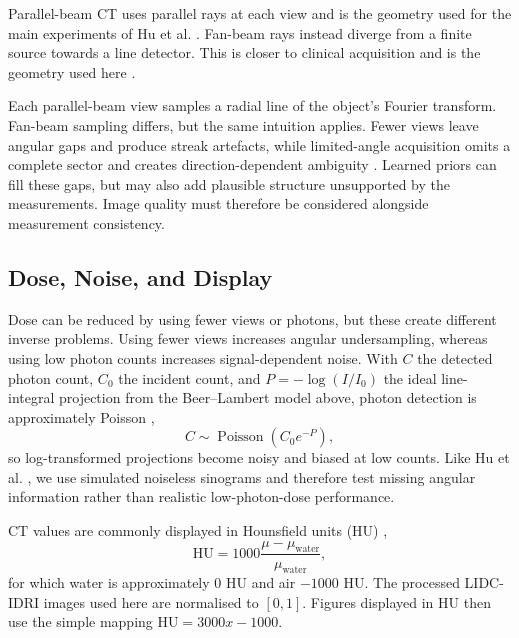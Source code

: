 Parallel-beam CT uses parallel rays at each view and is the geometry used for the main experiments of Hu et al. \cite{hu_learning_2024}. Fan-beam rays instead diverge from a finite source towards a line detector. This is closer to clinical acquisition and is the geometry used here \cite{wunderlich_image_2008}.

Each parallel-beam view samples a radial line of the object's Fourier transform. Fan-beam sampling differs, but the same intuition applies. Fewer views leave angular gaps and produce streak artefacts, while limited-angle acquisition omits a complete sector and creates direction-dependent ambiguity \cite{sidky_accurate_2006,frikel_characterization_2013}. Learned priors can fill these gaps, but may also add plausible structure unsupported by the measurements. Image quality must therefore be considered alongside measurement consistency.

\subsection{Dose, Noise, and Display}
\label{subsec:ct_noise_display}

Dose can be reduced by using fewer views or photons, but these create different inverse problems. Using fewer views increases angular undersampling, whereas using low photon counts increases signal-dependent noise. With $C$ the detected photon count, $C_0$ the incident count, and $P=-\log(I/I_0)$ the ideal line-integral projection from the Beer--Lambert model above, photon detection is approximately Poisson \cite{chang_modeling_2017},
\begin{equation}
C\sim\operatorname{Poisson}\!\left(C_0e^{-P}\right),
\label{eq:poisson_photon_count}
\end{equation}
so log-transformed projections become noisy and biased at low counts. Like Hu et al. \cite{hu_learning_2024}, we use simulated noiseless sinograms and therefore test missing angular information rather than realistic low-photon-dose performance.

CT values are commonly displayed in Hounsfield units (HU) \cite{abutaha_assessing_2021},
\begin{equation}
\mathrm{HU}=1000\frac{\mu-\mu_{\mathrm{water}}}{\mu_{\mathrm{water}}},
\label{eq:hounsfield_units}
\end{equation}
for which water is approximately $0$ HU and air $-1000$ HU. The processed LIDC-IDRI images used here are normalised to $[0,1]$. Figures displayed in HU then use the simple mapping $\mathrm{HU}=3000x-1000$.
